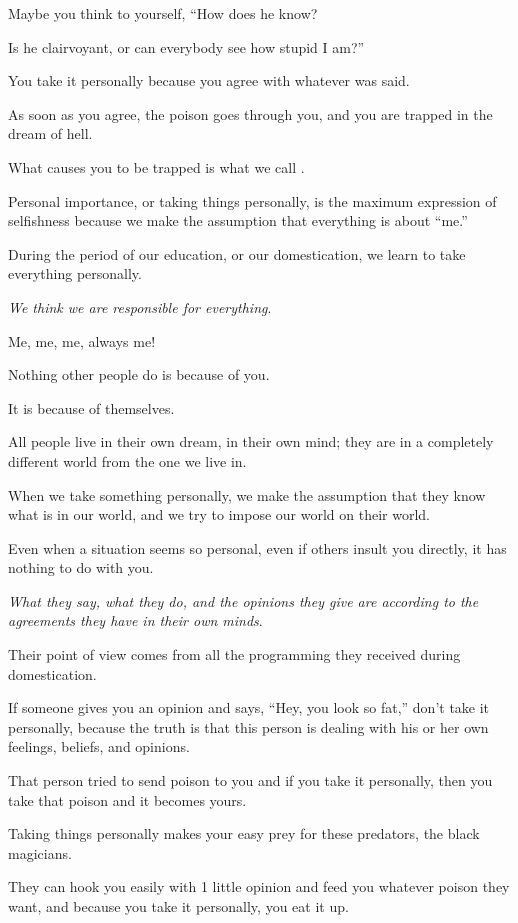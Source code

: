 \documentclass{article}
\numberwithin{equation}{section}
\begin{document}
Maybe you think to yourself, ``How does he know?

Is he clairvoyant, or can everybody see how stupid I am?''

%
You take it personally because you agree with whatever was said.

As soon as you agree, the poison goes through you, and you are trapped in the dream of hell.

What causes you to be trapped is what we call .

Personal importance, or taking things personally, is the maximum expression of selfishness because we make the assumption that everything is about ``me.''

During the period of our education, or our domestication, we learn to take everything personally.

\textit{We think we are responsible for everything}.

Me, me, me, always me!

%
Nothing other people do is because of you.

It is because of themselves.

All people live in their own dream, in their own mind; they are in a completely different world from the one we live in.

When we take something personally, we make the assumption that they know what is in our world, and we try to impose our world on their world.

%
Even when a situation seems so personal, even if others insult you directly, it has nothing to do with you.

\textit{What they say, what they do, and the opinions they give are according to the agreements they have in their own minds}.

Their point of view comes from all the programming they received during domestication.

%
If someone gives you an opinion and says, ``Hey, you look so fat,'' don't take it personally, because the truth is that this person is dealing with his or her own feelings, beliefs, and opinions.

That person tried to send poison to you and if you take it personally, then you take that poison and it becomes yours.

Taking things personally makes your easy prey for these predators, the black magicians.

They can hook you easily with 1 little opinion and feed you whatever poison they want, and because you take it personally, you eat it up.
\end{document}
